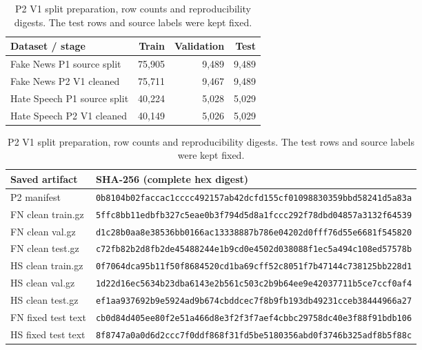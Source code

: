 \begin{table}[p]
\centering
\caption{P2 V1 split preparation, row counts and reproducibility digests.
The test rows and source labels were kept fixed.}
\label{tab:p2manifest}
\footnotesize
\begin{tabular}{lrrr}
\toprule
Dataset / stage & Train & Validation & Test \\
\midrule
Fake News P1 source split & 75,905 & 9,489 & 9,489 \\
Fake News P2 V1 cleaned & 75,711 & 9,467 & 9,489 \\
Hate Speech P1 source split & 40,224 & 5,028 & 5,029 \\
Hate Speech P2 V1 cleaned & 40,149 & 5,026 & 5,029 \\
\bottomrule
\end{tabular}

\vspace{7pt}
\scriptsize
\begin{tabular}{ll}
\toprule
Saved artifact & SHA-256 (complete hex digest) \\
\midrule
P2 manifest & \texttt{0b8104b02faccac1cccc492157ab42dcfd155cf01098830359bbd58241d5a83a} \\
FN clean train.gz & \texttt{5ffc8bb11edbfb327c5eae0b3f794d5d8a1fccc292f78dbd04857a3132f64539} \\
FN clean val.gz & \texttt{d1c28b0aa8e38536bb0166ac13338887b786e04202d0fff76d55e6681f545820} \\
FN clean test.gz & \texttt{c72fb82b2d8fb2de45488244e1b9cd0e4502d038088f1ec5a494c108ed57578b} \\
HS clean train.gz & \texttt{0f7064dca95b11f50f8684520cd1ba69cff52c8051f7b47144c738125bb228d1} \\
HS clean val.gz & \texttt{1d22d16ec5634b23dba6143e2b561c503c2b9b64ee9e42037711b5ce7ccf0af4} \\
HS clean test.gz & \texttt{ef1aa937692b9e5924ad9b674cbddcec7f8b9fb193db49231cceb38444966a27} \\
FN fixed test text & \texttt{cb0d84d405ee80f2e51a466d8e3f2f3f7aef4cbbc29758dc40e3f88f91bdb106} \\
HS fixed test text & \texttt{8f8747a0a0d6d2ccc7f0ddf868f31fd5be5180356abd0f3746b325adf8b5f88c} \\
\bottomrule
\end{tabular}


\end{table}

